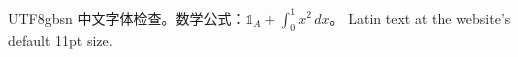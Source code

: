 \documentclass[11pt]{article}
\begin{document}
\begin{CJK*}{UTF8}{gbsn}
中文字体检查。数学公式：$\mathds{1}_A+\int_0^1 x^2\,dx$。
Latin text at the website's default 11pt size.
\end{CJK*}
\end{document}
